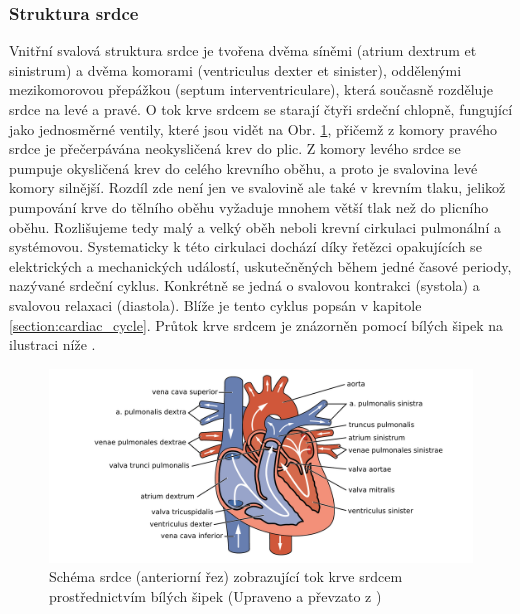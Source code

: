 \subsubsection{Struktura srdce}
\label{section:heart_structure}
Vnitřní svalová struktura srdce je tvořena dvěma síněmi (atrium dextrum et
sinistrum) a dvěma komorami (ventriculus dexter et sinister), oddělenými
mezikomorovou přepážkou (septum interventriculare), která současně rozděluje
srdce na levé a pravé. O tok krve srdcem se starají čtyři srdeční chlopně,
fungující jako jednosměrné ventily, které jsou vidět na Obr.
\ref{img:heartanatomy}, přičemž z komory pravého srdce je přečerpávána
neokysličená krev do plic. Z komory levého srdce se pumpuje okysličená krev do
celého krevního oběhu, a proto je svalovina levé komory silnější. Rozdíl zde není
jen ve svalovině ale také v krevním tlaku, jelikož pumpování krve do tělního
oběhu vyžaduje mnohem větší tlak než do plicního oběhu. Rozlišujeme tedy malý a
velký oběh neboli krevní cirkulaci pulmonální a systémovou. Systematicky k této
cirkulaci dochází díky řetězci opakujících se elektrických a mechanických
událostí, uskutečněných během jedné časové periody, nazývané srdeční cyklus.
Konkrétně se jedná o svalovou kontrakci (systola) a svalovou relaxaci
(diastola). Blíže je tento cyklus popsán v kapitole \ref{section:cardiac_cycle}.
Průtok krve srdcem je znázorněn pomocí bílých šipek na ilustraci níže
\cite{Memorix2017,Abbasi2014,Stejfa2006}.

\begin{figure}[h]
	\begin{center}
		\includegraphics[width=1\textwidth]{../assets/anatomy/heart}
		\caption{Schéma srdce (anteriorní řez) zobrazující tok krve srdcem
			prostřednictvím bílých šipek (Upraveno a převzato z
			\cite{OpenStax})}
		\label{img:heartanatomy}
	\end{center}
\end{figure}

